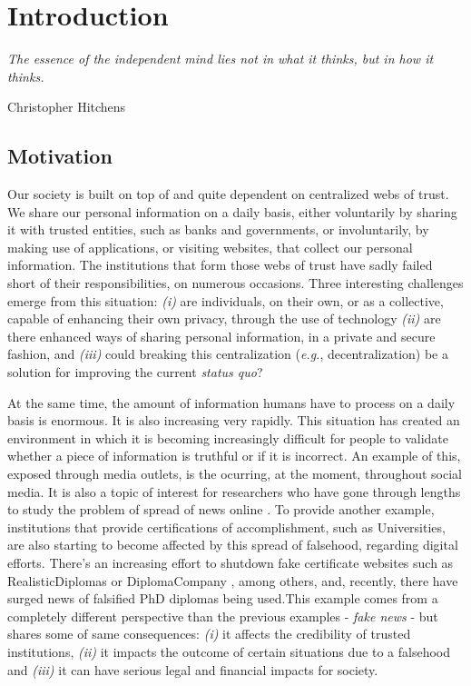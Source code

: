\chapter{Introduction}
\label{chap:intro}

\epigraph{\textit{The essence of the independent mind lies not in what it thinks, but in how it thinks.}}{Christopher Hitchens \cite{hitchens_letters_2009}}

\section{Motivation}

Our society is built on top of and quite dependent on centralized webs of trust. We share our personal information on a daily basis, either voluntarily by sharing it with trusted entities, such as banks and governments, or involuntarily, by making use of applications, or visiting websites, that collect our personal information. The institutions that form those webs of trust have sadly failed short of their responsibilities, on numerous occasions. Three interesting challenges emerge from this situation: \emph{(i)} are individuals, on their own, or as a collective, capable of enhancing their own privacy, through the use of technology \emph{(ii)} are there enhanced ways of sharing personal information, in a private and secure fashion, and \emph{(iii)} could breaking this centralization (\textit{e.g.}, decentralization) be a solution for improving the current \textit{status quo}?

At the same time, the amount of information humans have to process on a daily basis is enormous. It is also increasing very rapidly. This situation has created an environment in which it is becoming increasingly difficult for people to validate whether a piece of information is truthful or if it is incorrect. An example of this, exposed through media outlets, is the  ocurring, at the moment, throughout social media. It is also a topic of interest for researchers who have gone through lengths to study the problem of spread of news online \cite{vosoughi_spread_2018}. To provide another example, institutions that provide certifications of accomplishment, such as Universities, are also starting to become affected by this spread of falsehood, regarding digital efforts. There’s an increasing effort to shutdown fake certificate websites \cite{camilla_telegraph} such as RealisticDiplomas \cite{RealisticDiplomas} or DiplomaCompany \cite{DiplomaCompany}, among others, and, recently, there have surged news of falsified PhD diplomas being used.This example comes from a completely different perspective than the previous examples - \textit{fake news} - but shares some of same consequences: \emph{(i)} it affects the credibility of trusted institutions, \emph{(ii)} it impacts the outcome of certain situations due to a falsehood and \emph{(iii)} it can have serious legal and financial impacts for society.


